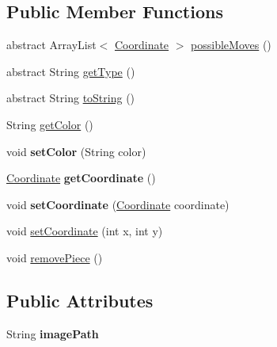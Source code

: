 \subsection*{Public Member Functions}
\begin{DoxyCompactItemize}
\item 
abstract Array\+List$<$ \hyperlink{classmain_1_1model_1_1_coordinate}{Coordinate} $>$ \hyperlink{classmain_1_1pieces_1_1_piece_a92a37b2f68604a6f2c8ece28d9a96080}{possible\+Moves} ()
\item 
abstract String \hyperlink{classmain_1_1pieces_1_1_piece_ae778ce746ff427326514c696cad72aba}{get\+Type} ()
\item 
abstract String \hyperlink{classmain_1_1pieces_1_1_piece_a528845eb51d394c21fd0f3d8a8011696}{to\+String} ()
\item 
String \hyperlink{classmain_1_1pieces_1_1_piece_a52545d99f7a6c36b99cfcf40fd0a9cef}{get\+Color} ()
\item 
\hypertarget{classmain_1_1pieces_1_1_piece_a2b808f44cec5a6b54ef073d1a89ea608}{}\label{classmain_1_1pieces_1_1_piece_a2b808f44cec5a6b54ef073d1a89ea608} 
void {\bfseries set\+Color} (String color)
\item 
\hypertarget{classmain_1_1pieces_1_1_piece_a69d998939d06b2bb749632864e0402b8}{}\label{classmain_1_1pieces_1_1_piece_a69d998939d06b2bb749632864e0402b8} 
\hyperlink{classmain_1_1model_1_1_coordinate}{Coordinate} {\bfseries get\+Coordinate} ()
\item 
\hypertarget{classmain_1_1pieces_1_1_piece_a7a6ab60bd575c3511957691989862745}{}\label{classmain_1_1pieces_1_1_piece_a7a6ab60bd575c3511957691989862745} 
void {\bfseries set\+Coordinate} (\hyperlink{classmain_1_1model_1_1_coordinate}{Coordinate} coordinate)
\item 
void \hyperlink{classmain_1_1pieces_1_1_piece_a2ffc0c01f80d164e8d471272061545d9}{set\+Coordinate} (int x, int y)
\item 
void \hyperlink{classmain_1_1pieces_1_1_piece_a58d0ca1c1f09ffd2470a4aec1b7e6854}{remove\+Piece} ()
\end{DoxyCompactItemize}
\subsection*{Public Attributes}
\begin{DoxyCompactItemize}
\item 
\hypertarget{classmain_1_1pieces_1_1_piece_a9f5e3f8b66b16fd732425936f63997ab}{}\label{classmain_1_1pieces_1_1_piece_a9f5e3f8b66b16fd732425936f63997ab} 
String {\bfseries image\+Path}
\end{DoxyCompactItemize}
